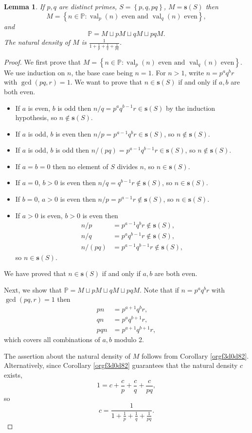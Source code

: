 \documentclass[12pt]{article}
\theoremstyle{definition}
\theoremstyle{remark}
\theoremstyle{plain}
\newtheorem{lemma}{Lemma}
\newcommand{\set}[1]{\left\{{#1}\right\}}
\newcommand\setsuchas[2]{\left\{{#1}:{#2}\right\}}
\newcommand{\NNp}{{\mathbb{P}}}
\newcommand{\val}{\operatorname{val}}
\newcommand{\ssift}[1]{\mathbf{s}({#1})}
\begin{document}
\begin{lemma}
If \(p,q\) are distinct primes, \(S=\set{p,q,pq}\), \(M=\ssift{S}\) then
\[M =\setsuchas{n \in \NNp}{\val_{p}(n) \text{ even and } \val_{q}(n) \text{ even}},\]
and
\[\NNp = M \sqcup pM \sqcup qM \sqcup pqM.\]
The natural density of \(M\) is
\(\frac{1}{1 + \frac{1}{p} + \frac{1}{q} + \frac{1}{pq}}\).
\label{orge402740}
\end{lemma}
\begin{proof}
We first prove that
\(M =\setsuchas{n \in \NNp}{\val_{p}(n) \text{ even and } \val_{q}(n) \text{ even}}\).
We use induction on \(n\), the base case being \(n=1\).
For \(n>1\), write \(n=p^{a}q^{b}r\) with \(\gcd(pq,r)=1\).
We want to prove that \(n \in \ssift{S}\) if and only if \(a,b\) are both even.
\begin{itemize}[label={\(\star\)}]
\item If \(a\) is even, \(b\) is odd then \(n/q = p^{a}q^{b-1}r \in \ssift{S}\) by the induction hypothesis, so \(n \not \in \ssift{S}\).
\item If \(a\) is odd, \(b\) is even then \(n/p = p^{a-1}q^{b}r \in \ssift{S}\), so \(n \not \in \ssift{S}\).
\item If \(a\) is odd, \(b\) is odd then \(n/(pq) = p^{a-1}q^{b-1}r \in \ssift{S}\), so \(n \not \in \ssift{S}\).
\item If \(a=b=0\) then no element of \(S\) divides \(n\), so \(n \in \ssift{S}\).
\item If \(a=0\), \(b>0\) is even then \(n/q = q^{b-1}r \not \in \ssift{S}\), so \(n \in \ssift{S}\).
\item If \(b=0\), \(a>0\) is even then \(n/p = p^{a-1}r \not \in \ssift{S}\), so \(n \in \ssift{S}\).
\item If \(a>0\) is even, \(b>0\) is even then
\begin{align*}
n/p & = p^{a-1}q^{b}r \not \in \ssift{S},\\
n/q & = p^{a}q^{b-1}r \not \in \ssift{S}, \\
n/(pq) &  = p^{a-1}q^{b-1}r \not \in \ssift{S},
\end{align*}
so \(n \in \ssift{S}\).
\end{itemize}

We have  proved that \(n \in \ssift{S}\) if and only if \(a,b\) are both even.  

Next, we show that  \(\NNp = M \sqcup pM \sqcup qM \sqcup pqM\).
Note that if  \(n=p^{a}q^{b}r\) with \(\gcd(pq,r)=1\) then
\begin{align*}
pn &= p^{a+1}q^{b}r, \\
qn &= p^{a}q^{b+1}r, \\
pqn &= p^{a+1}q^{b+1}r,
\end{align*}
which covers all combinations of \(a,b\) modulo 2.

The assertion about the natural density of \(M\) follows from Corollary \ref{orgf3d0d82}.
Alternatively, since Corollary \ref{orgf3d0d82} guarantees
that the natural density \(c\) exists,
\[1= c + \frac{c}{p} + \frac{c}{q} + \frac{c}{pq},\]
so
\[
c=\frac{1}{1 + \frac{1}{p} + \frac{1}{q} + \frac{1}{pq}}.
\]
\end{proof}
\end{document}
